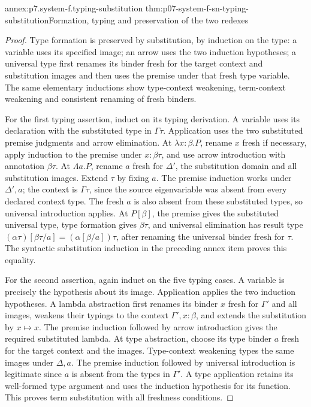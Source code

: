 \begin{annexitem}{annex:p7.system-f.typing-substitution}
 {thm:p07-system-f-sn-typing-substitution}{Formation, typing and preservation of the two redexes}
\begin{proof}
Type formation is preserved by substitution, by induction on the type:
a variable uses its specified image; an arrow uses the two induction
hypotheses; a universal type first renames its binder fresh for the target
context and substitution images and then uses the premise under that fresh
type variable. The same elementary inductions show type-context weakening,
term-context weakening and consistent renaming of fresh binders.

For the first typing assertion, induct on its typing derivation. A variable
uses its declaration with the substituted type in \(\Gamma\tau\).
Application uses the two substituted premise judgments and arrow elimination.
At \(\lambda x{:}\beta.P\), rename \(x\) fresh if necessary, apply
induction to the premise under \(x:\beta\tau\), and use arrow
introduction with annotation \(\beta\tau\).
At \(\Lambda a.P\), rename \(a\) fresh for \(\Delta'\), the
substitution domain and all substitution images. Extend \(\tau\) by
fixing \(a\). The premise induction works under \(\Delta',a\);
the context is \(\Gamma\tau\), since the source eigenvariable was
absent from every declared context type. The fresh \(a\) is also absent
from these substituted types, so universal introduction applies.
At \(P[\beta]\), the premise gives the substituted universal type,
type formation gives \(\beta\tau\), and universal elimination has
result type
\((\alpha\tau)[\beta\tau/a]=(\alpha[\beta/a])\tau\), after
renaming the universal binder fresh for \(\tau\). The syntactic
substitution induction in the preceding annex item proves this equality.

For the second assertion, again induct on the five typing cases. A variable
is precisely the hypothesis about its image. Application applies the two
induction hypotheses. A lambda abstraction first renames its binder \(x\)
fresh for \(\Gamma'\) and all images, weakens their typings to the context
\(\Gamma',x:\beta\), and extends the substitution by \(x\mapsto x\).
The premise induction followed by arrow introduction gives the required
substituted lambda. At type abstraction, choose its type binder \(a\)
fresh for the target context and the images. Type-context weakening types
the same images under \(\Delta,a\). The premise induction followed by
universal introduction is legitimate since \(a\) is absent from
the types in \(\Gamma'\). A type application retains its well-formed
type argument and uses the induction hypothesis for its function.
This proves term substitution with all freshness conditions.


\end{proof}
\end{annexitem}
